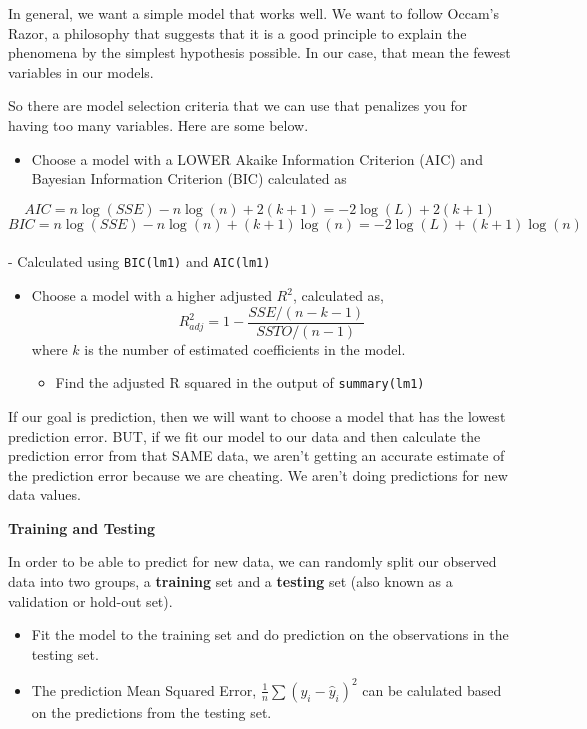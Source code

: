 \documentclass[
]{book}
\providecommand{\tightlist}{%
  \setlength{\itemsep}{0pt}\setlength{\parskip}{0pt}}
\begin{document}
In general, we want a simple model that works well. We want to follow Occam's Razor, a philosophy that suggests that it is a good principle to explain the phenomena by the simplest hypothesis possible. In our case, that mean the fewest variables in our models.

So there are model selection criteria that we can use that penalizes you for having too many variables. Here are some below.

\begin{itemize}
\tightlist
\item
  Choose a model with a LOWER Akaike Information Criterion (AIC) and Bayesian Information Criterion (BIC) calculated as
\end{itemize}

\[AIC = n\log(SSE) - n\log(n) + 2(k+1) = -2\log(L) + 2(k+1)\]
\[BIC = n\log(SSE) -n\log(n) + (k+1)\log(n)= -2\log(L) + (k+1)\log(n)\]\\
- Calculated using \texttt{BIC(lm1)} and \texttt{AIC(lm1)}

\begin{itemize}
\tightlist
\item
  Choose a model with a higher adjusted \(R^2\), calculated as,
  \[R^2_{adj} = 1 - \frac{SSE/(n-k-1)}{SSTO/(n-1)}\]
  where \(k\) is the number of estimated coefficients in the model.

  \begin{itemize}
  \tightlist
  \item
    Find the adjusted R squared in the output of \texttt{summary(lm1)}
  \end{itemize}
\end{itemize}

If our goal is prediction, then we will want to choose a model that has the lowest prediction error. BUT, if we fit our model to our data and then calculate the prediction error from that SAME data, we aren't getting an accurate estimate of the prediction error because we are cheating. We aren't doing predictions for new data values.

\textbf{Training and Testing}

In order to be able to predict for new data, we can randomly split our observed data into two groups, a \textbf{training} set and a \textbf{testing} set (also known as a validation or hold-out set).

\begin{itemize}
\tightlist
\item
  Fit the model to the training set and do prediction on the observations in the testing set.
\item
  The prediction Mean Squared Error, \(\frac{1}{n}\sum(y_i - \hat{y}_i)^2\) can be calulated based on the predictions from the testing set.
\end{itemize}
\end{document}
